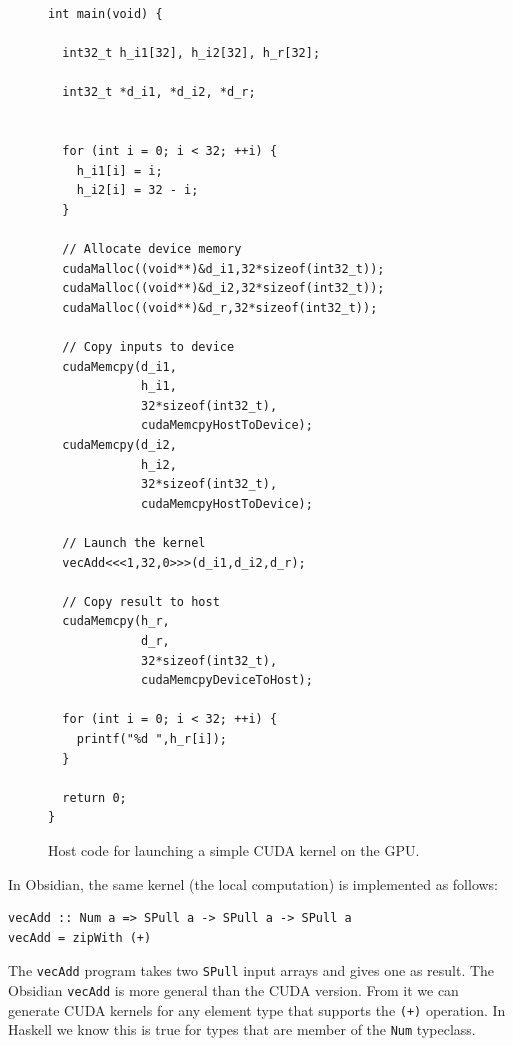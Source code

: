 \documentclass[a4paper]{book}
\begin{document}
\begin{figure} 
\begin{small}
\begin{Verbatim}[samepage=true]
int main(void) {
  
  int32_t h_i1[32], h_i2[32], h_r[32]; 

  int32_t *d_i1, *d_i2, *d_r;

  
  for (int i = 0; i < 32; ++i) { 
    h_i1[i] = i;
    h_i2[i] = 32 - i;
  }

  // Allocate device memory
  cudaMalloc((void**)&d_i1,32*sizeof(int32_t));
  cudaMalloc((void**)&d_i2,32*sizeof(int32_t));
  cudaMalloc((void**)&d_r,32*sizeof(int32_t));
  
  // Copy inputs to device
  cudaMemcpy(d_i1,
             h_i1,
             32*sizeof(int32_t),
             cudaMemcpyHostToDevice);
  cudaMemcpy(d_i2,
             h_i2,
             32*sizeof(int32_t),
             cudaMemcpyHostToDevice);
  
  // Launch the kernel
  vecAdd<<<1,32,0>>>(d_i1,d_i2,d_r); 

  // Copy result to host
  cudaMemcpy(h_r,
             d_r,
             32*sizeof(int32_t),
             cudaMemcpyDeviceToHost);

  for (int i = 0; i < 32; ++i) { 
    printf("%d ",h_r[i]);
  }

  return 0;
}
\end{Verbatim} 
\end{small}

\caption{Host code for launching a simple CUDA kernel on the GPU.}
\label{fig:CUDACODE1}

\end{figure} 

% 

In Obsidian, the same kernel (the local computation) is implemented as follows: 

\begin{small}
\begin{Verbatim}[samepage=true]
vecAdd :: Num a => SPull a -> SPull a -> SPull a
vecAdd = zipWith (+)
\end{Verbatim}
\end{small}

\noindent The {\tt vecAdd} program takes two {\tt SPull} input arrays and gives one 
as result. The Obsidian {\tt vecAdd} is more general than the CUDA version. From it 
we can generate CUDA kernels for any element type that supports the {\tt (+)} operation. 
In Haskell we know this is true for types that are member of the {\tt Num} typeclass.  
\end{document}
